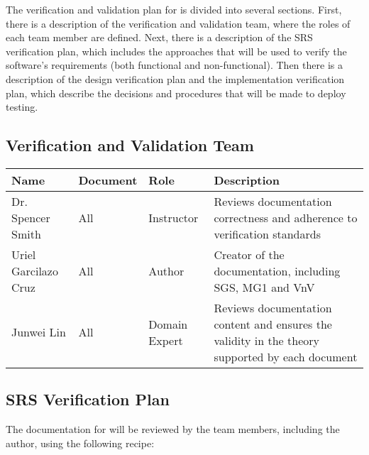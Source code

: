 \documentclass[12pt, titlepage]{article}
\begin{document}
The verification and validation plan for \progname{} is divided into several sections. 
First, there is a description of the verification and validation team, where the roles of
each team member are defined. Next, there is a description of the SRS verification plan, 
which includes the approaches that will be used to verify the software's requirements 
(both functional and non-functional). Then there is a description of the design verification
plan and the implementation verification plan, which describe the decisions and procedures 
that will be made to deploy testing.





\subsection{Verification and Validation Team}

\begin{table}[h]
  \begin{tabular}{|p{3cm}|p{2cm}|p{2.5cm}|p{6cm}|}
  \hline
  Name & Document & Role & Description \\
  \hline
  Dr. Spencer Smith & All & Instructor & Reviews documentation correctness and adherence to verification standards \\
  \hline
  Uriel Garcilazo Cruz & All & Author & Creator of the documentation, including SGS, MG1 and VnV \\
  \hline
  Junwei Lin & All & Domain Expert & Reviews documentation content and ensures the validity in the theory supported by each document \\
  \hline
  \end{tabular}
\end{table}


\subsection{SRS Verification Plan}

The documentation for \progname{} will be reviewed by the team members, including the author,
using the following recipe:
\end{document}
